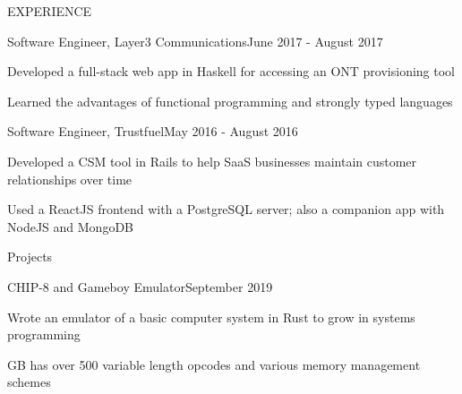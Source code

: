 \documentclass{resume} %
\begin{document}
\begin{rSection}{EXPERIENCE}

  \begin{rSubsection}{Software Engineer, Layer3 Communications}{June 2017 - August 2017}{}{}
  \item Developed a full-stack web app in Haskell for accessing an ONT provisioning tool
  \item Learned the advantages of functional programming and strongly typed languages
  \end{rSubsection} 


  \begin{rSubsection}{Software Engineer, Trustfuel}{May 2016 - August 2016}{}{}
  \item Developed a CSM tool in Rails to help SaaS businesses maintain customer relationships over time
  \item Used a ReactJS frontend with a PostgreSQL server; also a companion app with NodeJS and MongoDB
  \end{rSubsection} 

\end{rSection}


\begin{rSection}{Projects}

  \begin{rSubsection}{CHIP-8 and Gameboy Emulator}{September 2019}{}{}
  \item Wrote an emulator of a basic computer system in Rust to grow in systems programming
  \item GB has over 500 variable length opcodes and various memory management schemes
  \end{rSubsection}

\end{rSection}


\end{document}
